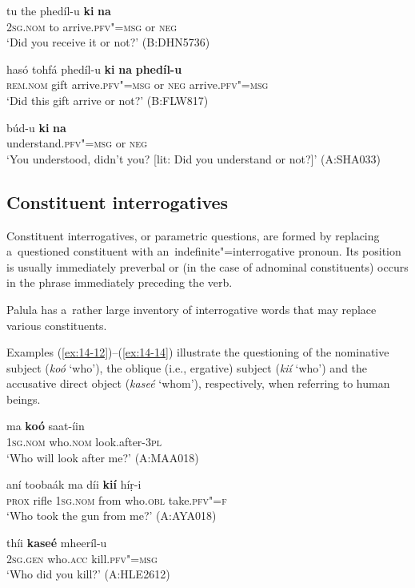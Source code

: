 \begin{exe}
\ex
\label{ex:14-9}
\gll tu the phedíl-u \textbf{ki} \textbf{na} \\
\textsc{2sg.nom} to arrive.\textsc{pfv"=msg} or \textsc{neg} \\
\glt `Did you receive it or not?' (B:DHN5736)

\ex
\label{ex:14-10}
\gll hasó tohfá phedíl-u \textbf{ki} \textbf{na} \textbf{phedíl-u}  \\
\textsc{rem.nom} gift arrive.\textsc{pfv"=msg} or \textsc{neg}  arrive.\textsc{pfv"=msg} \\
\glt `Did this gift arrive or not?' (B:FLW817)

\ex
\label{ex:14-11}
\gll búd-u \textbf{ki} \textbf{na} \\
understand.\textsc{pfv"=msg} or \textsc{neg} \\
\glt `You understood, didn't you? [lit: Did you understand or not?]' (A:SHA033)
\end{exe}
\subsection{Constituent interrogatives}
\label{subsec:14-2-2}

Constituent interrogatives, or parametric questions, are formed by replacing a~questioned constituent with an~indefinite"=interrogative pronoun. Its position is usually immediately preverbal or (in the case of adnominal constituents) occurs in the phrase immediately preceding the verb.


Palula has a~rather large inventory of interrogative words that may replace various constituents.


 Examples (\ref{ex:14-12})--(\ref{ex:14-14}) illustrate the questioning of the nominative subject (\textit{koó} `who'), the oblique (i.e., ergative) subject (\textit{kií} `who') and the accusative direct object (\textit{kaseé} `whom'), respectively, when referring to human beings.

\begin{exe}
\ex
\label{ex:14-12}
\gll ma \textbf{koó} saat-íin \\
\textsc{1sg}.\textsc{nom} who.\textsc{nom} look.after-\textsc{3pl} \\
\glt `Who will look after me?' (A:MAA018)

\ex
\label{ex:14-13}
\gll aní toobaák ma díi \textbf{kií} híṛ-i\\
\textsc{prox} rifle \textsc{1sg.nom} from who.\textsc{obl} take.\textsc{pfv"=f} \\
\glt `Who took the gun from me?' (A:AYA018)

\ex
\label{ex:14-14}
\gll thíi \textbf{kaseé} mheeríl-u \\
\textsc{2sg.gen} who.\textsc{acc} kill.\textsc{pfv"=msg} \\
\glt `Who did you kill?' (A:HLE2612)
\end{exe}

